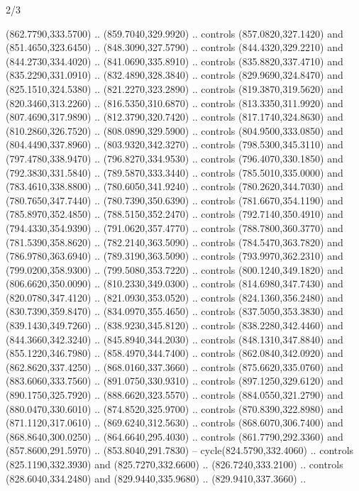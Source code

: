 \begin{flagdescription}{2/3}
\begin{scope}[xshift=\flaglength/2,yshift=\flagwidth/2,scale=\flagwidth/341]
\begin{scope}[xshift=-20mm,yshift=38.3mm,scale=0.1565]
\begin{scope}[y=0.80pt, x=0.80pt, yscale=-1, xscale=1,draw=gold,fill=white]
\begin{scope}[line join=round,line cap=round,line width=1.016\lw]
\begin{scope}[fill]
  (862.7790,333.5700) .. (859.7040,329.9920) .. controls (857.0820,327.1420) and
  (851.4650,323.6450) .. (848.3090,327.5790) .. controls (844.4320,329.2210) and
  (844.2730,334.4020) .. (841.0690,335.8910) .. controls (835.8820,337.4710) and
  (835.2290,331.0910) .. (832.4890,328.3840) .. controls (829.9690,324.8470) and
  (825.1510,324.5380) .. (821.2270,323.2890) .. controls (819.3870,319.5620) and
  (820.3460,313.2260) .. (816.5350,310.6870) .. controls (813.3350,311.9920) and
  (807.4690,317.9890) .. (812.3790,320.7420) .. controls (817.1740,324.8630) and
  (810.2860,326.7520) .. (808.0890,329.5900) .. controls (804.9500,333.0850) and
  (804.4490,337.8960) .. (803.9320,342.3270) .. controls (798.5300,345.3110) and
  (797.4780,338.9470) .. (796.8270,334.9530) .. controls (796.4070,330.1850) and
  (792.3830,331.5840) .. (789.5870,333.3440) .. controls (785.5010,335.0000) and
  (783.4610,338.8800) .. (780.6050,341.9240) .. controls (780.2620,344.7030) and
  (780.7650,347.7440) .. (780.7390,350.6390) .. controls (781.6670,354.1190) and
  (785.8970,352.4850) .. (788.5150,352.2470) .. controls (792.7140,350.4910) and
  (794.4330,354.9390) .. (791.0620,357.4770) .. controls (788.7800,360.3770) and
  (781.5390,358.8620) .. (782.2140,363.5090) .. controls (784.5470,363.7820) and
  (786.9780,363.6940) .. (789.3190,363.5090) .. controls (793.9970,362.2310) and
  (799.0200,358.9300) .. (799.5080,353.7220) .. controls (800.1240,349.1820) and
  (806.6620,350.0090) .. (810.2330,349.0300) .. controls (814.6980,347.7430) and
  (820.0780,347.4120) .. (821.0930,353.0520) .. controls (824.1360,356.2480) and
  (830.7390,359.8470) .. (834.0970,355.4650) .. controls (837.5050,353.3830) and
  (839.1430,349.7260) .. (838.9230,345.8120) .. controls (838.2280,342.4460) and
  (844.3660,342.3240) .. (845.8940,344.2030) .. controls (848.1310,347.8840) and
  (855.1220,346.7980) .. (858.4970,344.7400) .. controls (862.0840,342.0920) and
  (862.8620,337.4250) .. (868.0160,337.3660) .. controls (875.6620,335.0760) and
  (883.6060,333.7560) .. (891.0750,330.9310) .. controls (897.1250,329.6120) and
  (890.1750,325.7920) .. (888.6620,323.5570) .. controls (884.0550,321.2790) and
  (880.0470,330.6010) .. (874.8520,325.9700) .. controls (870.8390,322.8980) and
  (871.1120,317.0610) .. (869.6240,312.5630) .. controls (868.6070,306.7400) and
  (868.8640,300.0250) .. (864.6640,295.4030) .. controls (861.7790,292.3360) and
  (857.8600,291.5970) .. (853.8040,291.7830) -- cycle(824.5790,332.4060) ..
  controls (825.1190,332.3930) and (825.7270,332.6600) .. (826.7240,333.2100) ..
  controls (828.6040,334.2480) and (829.9440,335.9680) .. (829.9410,337.3660) ..

\end{scope}
\end{scope}
\end{scope}
\end{scope}
\end{scope}
\end{flagdescription}
